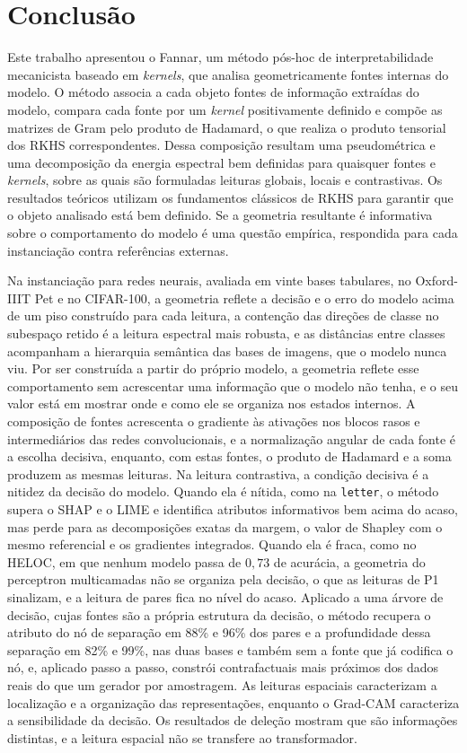 \section{Conclusão}\label{sec:conclusao}

Este trabalho apresentou o Fannar, um método pós-hoc de interpretabilidade mecanicista baseado em \textit{kernels}, que analisa geometricamente fontes internas do modelo. O método associa a cada objeto fontes de informação extraídas do modelo, compara cada fonte por um \textit{kernel} positivamente definido e compõe as matrizes de Gram pelo produto de Hadamard, o que realiza o produto tensorial dos RKHS correspondentes. Dessa composição resultam uma pseudométrica e uma decomposição da energia espectral bem definidas para quaisquer fontes e \textit{kernels}, sobre as quais são formuladas leituras globais, locais e contrastivas. Os resultados teóricos utilizam os fundamentos clássicos de RKHS para garantir que o objeto analisado está bem definido. Se a geometria resultante é informativa sobre o comportamento do modelo é uma questão empírica, respondida para cada instanciação contra referências externas.

Na instanciação para redes neurais, avaliada em vinte bases tabulares, no Oxford-IIIT Pet e no CIFAR-100, a geometria reflete a decisão e o erro do modelo acima de um piso construído para cada leitura, a contenção das direções de classe no subespaço retido é a leitura espectral mais robusta, e as distâncias entre classes acompanham a hierarquia semântica das bases de imagens, que o modelo nunca viu. Por ser construída a partir do próprio modelo, a geometria reflete esse comportamento sem acrescentar uma informação que o modelo não tenha, e o seu valor está em mostrar onde e como ele se organiza nos estados internos. A composição de fontes acrescenta o gradiente às ativações nos blocos rasos e intermediários das redes convolucionais, e a normalização angular de cada fonte é a escolha decisiva, enquanto, com estas fontes, o produto de Hadamard e a soma produzem as mesmas leituras. Na leitura contrastiva, a condição decisiva é a nitidez da decisão do modelo. Quando ela é nítida, como na \texttt{letter}, o método supera o SHAP e o LIME e identifica atributos informativos bem acima do acaso, mas perde para as decomposições exatas da margem, o valor de Shapley com o mesmo referencial e os gradientes integrados. Quando ela é fraca, como no HELOC, em que nenhum modelo passa de $0{,}73$ de acurácia, a geometria do perceptron multicamadas não se organiza pela decisão, o que as leituras de P1 sinalizam, e a leitura de pares fica no nível do acaso. Aplicado a uma árvore de decisão, cujas fontes são a própria estrutura da decisão, o método recupera o atributo do nó de separação em 88\% e 96\% dos pares e a profundidade dessa separação em 82\% e 99\%, nas duas bases e também sem a fonte que já codifica o nó, e, aplicado passo a passo, constrói contrafactuais mais próximos dos dados reais do que um gerador por amostragem. As leituras espaciais caracterizam a localização e a organização das representações, enquanto o Grad-CAM caracteriza a sensibilidade da decisão. Os resultados de deleção mostram que são informações distintas, e a leitura espacial não se transfere ao transformador.

